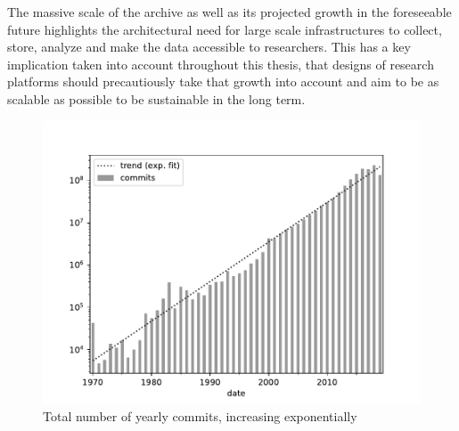 The massive scale of the archive as well as its projected growth in the
foreseeable future highlights the architectural need for large scale
infrastructures to collect, store, analyze and make the data accessible to
researchers. This has a key implication taken into account throughout this
thesis, that designs of research platforms should precautiously take that
growth into account and aim to be as scalable as possible to be sustainable in
the long term.

\begin{figure}
    \centering
    \includegraphics[width=0.5\linewidth]{img/commit-growth}
    \caption{Total number of yearly commits, increasing
    exponentially~\cite{ieee-sw-gender-swh}}%
    \label{fig:swh-commit-growth}
\end{figure}
